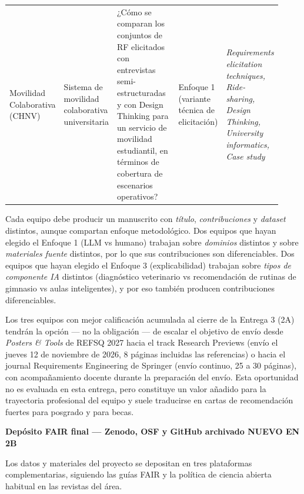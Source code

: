 \documentclass[11pt,a4paper]{article}
\newcounter{secc}
\newcommand{\secband}[1]{%
    \stepcounter{secc}\par\vspace{9pt}\noindent
    {\setlength{\fboxsep}{0pt}%
        \colorbox{uteqgold}{\parbox[c][20pt][c]{0.05\textwidth}{\centering\textbf{\color{white}\small \arabic{secc}}}}%
        \colorbox{uteqgreen}{\parbox[c][20pt][c]{0.95\textwidth}{\hspace{8pt}\textbf{\color{white}\small #1}}}%
    }\par\vspace{5pt}}
\newcommand{\bF}{{\setlength{\fboxsep}{1.5pt}\colorbox{crimsonfin}{\scriptsize\bfseries\color{white}NUEVO EN 2B}}}
\begin{document}
\begin{longtable}{@{}p{0.115\linewidth} p{0.185\linewidth} p{0.30\linewidth} p{0.12\linewidth} p{0.20\linewidth}@{}}
    Movilidad Colaborativa (CHNV) & Sistema de movilidad colaborativa universitaria & ¿Cómo se comparan los conjuntos de RF elicitados con entrevistas semi-estructuradas y con Design Thinking para un servicio de movilidad estudiantil, en términos de cobertura de escenarios operativos? & Enfoque 1 (variante técnica de elicitación) & \emph{Requirements elicitation techniques, Ride-sharing, Design Thinking, University informatics, Case study}\\
\end{longtable}

\begin{notabox}[title=Regla de no solapamiento y de adaptación]
    Cada equipo debe producir un manuscrito con \emph{título}, \emph{contribuciones} y \emph{dataset} distintos, aunque compartan enfoque metodológico.
    Dos equipos que hayan elegido el Enfoque 1 (LLM vs humano) trabajan sobre \emph{dominios} distintos y sobre \emph{materiales fuente} distintos, por lo que sus contribuciones son diferenciables.
    Dos equipos que hayan elegido el Enfoque 3 (explicabilidad) trabajan sobre \emph{tipos de componente IA} distintos (diagnóstico veterinario vs recomendación de rutinas de gimnasio vs aulas inteligentes), y por eso también producen contribuciones diferenciables.
\end{notabox}

\begin{pubbox}[title=Compromiso adicional para los equipos con mejor calificación acumulada]
    Los tres equipos con mejor calificación acumulada al cierre de la Entrega 3 (2A) tendrán la opción --- no la obligación --- de escalar el objetivo de envío desde \emph{Posters \& Tools} de REFSQ 2027 hacia el track Research Previews (envío el jueves 12 de noviembre de 2026, 8 páginas incluidas las referencias) o hacia el journal Requirements Engineering de Springer (envío continuo, 25 a 30 páginas), con acompañamiento docente durante la preparación del envío.
    Esta oportunidad no es evaluada en esta entrega, pero constituye un valor añadido para la trayectoria profesional del equipo y suele traducirse en cartas de recomendación fuertes para posgrado y para becas.
\end{pubbox}
\secband{Depósito FAIR final --- Zenodo, OSF y GitHub archivado \bF}

Los datos y materiales del proyecto se depositan en tres plataformas complementarias, siguiendo las guías FAIR \cite{wilkinson2016fair} y la política de ciencia abierta habitual en las revistas del área.
\end{document}
